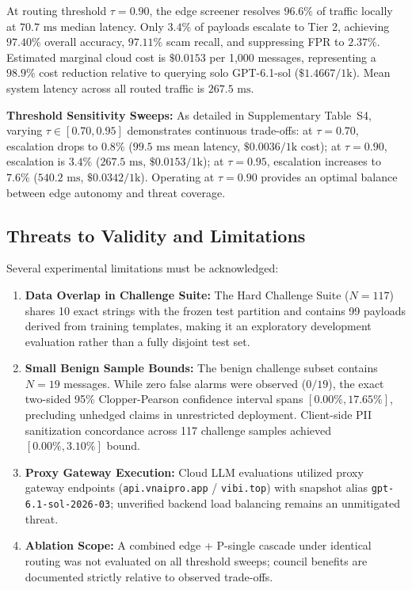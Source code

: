 At routing threshold $\tau = 0.90$, the edge screener resolves $96.6\%$ of traffic locally at $70.7\text{ ms}$ median latency. Only $3.4\%$ of payloads escalate to Tier 2, achieving $97.40\%$ overall accuracy, $97.11\%$ scam recall, and suppressing FPR to $2.37\%$. Estimated marginal cloud cost is $\$0.0153$ per 1,000 messages, representing a $98.9\%$ cost reduction relative to querying solo GPT-6.1-sol ($\$1.4667/1\text{k}$). Mean system latency across all routed traffic is $267.5\text{ ms}$.

\textbf{Threshold Sensitivity Sweeps:} As detailed in Supplementary Table~S4, varying $\tau \in [0.70, 0.95]$ demonstrates continuous trade-offs: at $\tau = 0.70$, escalation drops to $0.8\%$ ($99.5\text{ ms}$ mean latency, $\$0.0036/1\text{k}$ cost); at $\tau = 0.90$, escalation is $3.4\%$ ($267.5\text{ ms}$, $\$0.0153/1\text{k}$); at $\tau = 0.95$, escalation increases to $7.6\%$ ($540.2\text{ ms}$, $\$0.0342/1\text{k}$). Operating at $\tau = 0.90$ provides an optimal balance between edge autonomy and threat coverage.

\subsection{Threats to Validity and Limitations}
\label{subsec:threats}

Several experimental limitations must be acknowledged:
\begin{enumerate}
    \item \textbf{Data Overlap in Challenge Suite:} The Hard Challenge Suite ($N=117$) shares 10 exact strings with the frozen test partition and contains 99 payloads derived from training templates, making it an exploratory development evaluation rather than a fully disjoint test set.
    \item \textbf{Small Benign Sample Bounds:} The benign challenge subset contains $N=19$ messages. While zero false alarms were observed ($0/19$), the exact two-sided 95\% Clopper-Pearson confidence interval spans $[0.00\%, 17.65\%]$, precluding unhedged claims in unrestricted deployment. Client-side PII sanitization concordance across 117 challenge samples achieved $[0.00\%, 3.10\%]$ bound.
    \item \textbf{Proxy Gateway Execution:} Cloud LLM evaluations utilized proxy gateway endpoints (\texttt{api.vnaipro.app} / \texttt{vibi.top}) with snapshot alias \texttt{gpt-6.1-sol-2026-03}; unverified backend load balancing remains an unmitigated threat.
    \item \textbf{Ablation Scope:} A combined edge + P-single cascade under identical routing was not evaluated on all threshold sweeps; council benefits are documented strictly relative to observed trade-offs.
\end{enumerate}